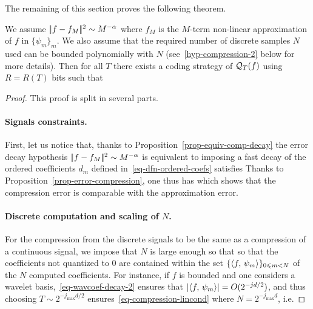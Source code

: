 The remaining of this section proves the following theorem.

\begin{thm}\label{thm-compression}
	We assume $|\!| f-f_M |\!|^2 \sim M^{-\alpha}$ where $f_M$ is the $M$-term non-linear approximation of $f$ in $\{\psi_m\}_m$.
	We also assume that the required number of discrete samples $N$ used can be bounded polynomially with $N$ (see~\eqref{hyp-compression-2} below for more details).
	Then for all $T$ there exists a coding strategy of $\mathcal{Q}_T(f)$ using $R=R(T)$ bits such that 
\end{thm}


\begin{proof} This proof is split in several parts.

\paragraph{Signals constraints.}

First, let us notice that, thanks to Proposition~\ref{prop-equiv-comp-decay} the error decay hypothesis $|\!| f-f_M |\!|^2 \sim M^{-\alpha}$ is equivalent to imposing a fast decay of the ordered coefficients $d_m$ defined in~\eqref{eq-dfn-ordered-coefs} satisfies 
Thanks to Proposition~\ref{prop-error-compression}, one thus has
which shows that the compression error is comparable with the approximation error. 

\paragraph{Discrete computation and scaling of $N$.}
 
For the compression from the discrete signals to be the same as a compression of a continuous signal, we impose that $N$ is large enough so that 
so that the coefficients not quantized to $0$ are contained within the set $\{ \langle f,\,\psi_m\rangle \}_{0 \leqslant m < N}$ of the $N$ computed coefficients.
%
For instance, if $f$ is bounded and one considers a wavelet basis,~\eqref{eq-wavcoef-decay-2} ensures that $|\langle f,\,\psi_m\rangle|=O(2^{-jd/2})$, and thus choosing $T \sim 2^{-j_{\max} d/2}$ ensures~\eqref{eq-compression-lincond} where $N=2^{-j_{\max}d}$, i.e. 


\end{proof}

